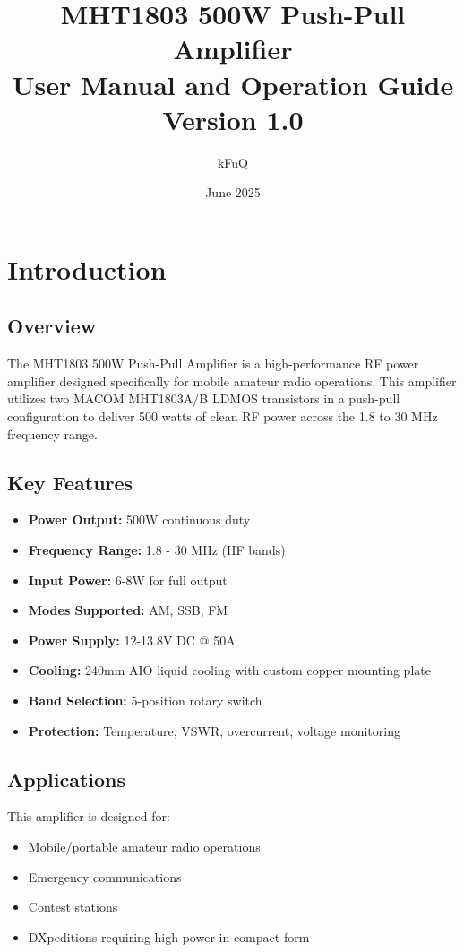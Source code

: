 \documentclass[11pt,a4paper]{article}
\title{\Huge\textbf{MHT1803 500W Push-Pull Amplifier}\\
\Large User Manual and Operation Guide\\
\large Version 1.0}
\author{kFuQ}
\date{June 2025}
\begin{document}
\maketitle
\thispagestyle{empty}

\newpage
\tableofcontents
\newpage

\section{Introduction}

\subsection{Overview}
The MHT1803 500W Push-Pull Amplifier is a high-performance RF power amplifier designed specifically for mobile amateur radio operations. This amplifier utilizes two MACOM MHT1803A/B LDMOS transistors in a push-pull configuration to deliver 500 watts of clean RF power across the 1.8 to 30 MHz frequency range.

\subsection{Key Features}
\begin{itemize}
    \item \textbf{Power Output:} 500W continuous duty
    \item \textbf{Frequency Range:} 1.8 - 30 MHz (HF bands)
    \item \textbf{Input Power:} 6-8W for full output
    \item \textbf{Modes Supported:} AM, SSB, FM
    \item \textbf{Power Supply:} 12-13.8V DC @ 50A
    \item \textbf{Cooling:} 240mm AIO liquid cooling with custom copper mounting plate
    \item \textbf{Band Selection:} 5-position rotary switch
    \item \textbf{Protection:} Temperature, VSWR, overcurrent, voltage monitoring
\end{itemize}

\subsection{Applications}
This amplifier is designed for:
\begin{itemize}
    \item Mobile/portable amateur radio operations
    \item Emergency communications
    \item Contest stations
    \item DXpeditions requiring high power in compact form
\end{itemize}
\end{document}
